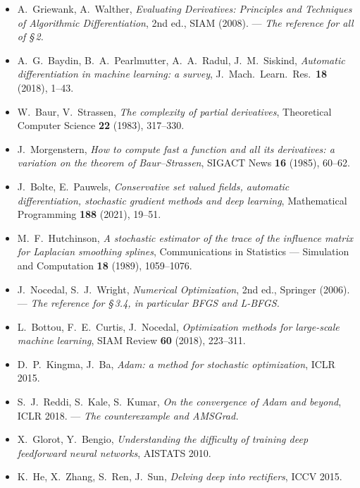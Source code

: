 \documentclass[11pt,a4paper]{article}
\begin{document}
\begin{itemize}[leftmargin=*, itemsep=4pt]
\item A.~Griewank, A.~Walther, \emph{Evaluating Derivatives: Principles and Techniques of
Algorithmic Differentiation}, 2nd ed., SIAM (2008). --- \emph{The reference for all of §\,2.}
\item A.~G.~Baydin, B.~A.~Pearlmutter, A.~A.~Radul, J.~M.~Siskind, \emph{Automatic differentiation
in machine learning: a survey}, J.~Mach.\ Learn.\ Res.\ \textbf{18} (2018), 1--43.
\item W.~Baur, V.~Strassen, \emph{The complexity of partial derivatives}, Theoretical Computer
Science \textbf{22} (1983), 317--330.
\item J.~Morgenstern, \emph{How to compute fast a function and all its derivatives: a variation on
the theorem of Baur--Strassen}, SIGACT News \textbf{16} (1985), 60--62.
\item J.~Bolte, E.~Pauwels, \emph{Conservative set valued fields, automatic differentiation,
stochastic gradient methods and deep learning}, Mathematical Programming \textbf{188} (2021),
19--51.
\item M.~F.~Hutchinson, \emph{A stochastic estimator of the trace of the influence matrix for
Laplacian smoothing splines}, Communications in Statistics --- Simulation and Computation
\textbf{18} (1989), 1059--1076.
\item J.~Nocedal, S.~J.~Wright, \emph{Numerical Optimization}, 2nd ed., Springer (2006). ---
\emph{The reference for §\,3.4, in particular BFGS and L-BFGS.}
\item L.~Bottou, F.~E.~Curtis, J.~Nocedal, \emph{Optimization methods for large-scale machine
learning}, SIAM Review \textbf{60} (2018), 223--311.
\item D.~P.~Kingma, J.~Ba, \emph{Adam: a method for stochastic optimization}, ICLR 2015.
\item S.~J.~Reddi, S.~Kale, S.~Kumar, \emph{On the convergence of Adam and beyond}, ICLR 2018. ---
\emph{The counterexample and AMSGrad.}
\item X.~Glorot, Y.~Bengio, \emph{Understanding the difficulty of training deep feedforward neural
networks}, AISTATS 2010.
\item K.~He, X.~Zhang, S.~Ren, J.~Sun, \emph{Delving deep into rectifiers}, ICCV 2015.
\end{itemize}
\end{document}
